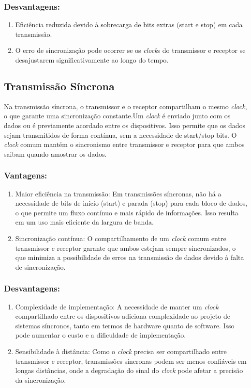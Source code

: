 \documentclass[12pt]{article}
\begin{document}
\subsubsection{Desvantagens:}
\begin{enumerate}
    \item Eficiência reduzida devido à sobrecarga de bits extras (start e stop) em cada transmissão.
    \item O erro de sincronização pode ocorrer se os \textit{clock}s do transmissor e receptor se desajustarem significativamente ao longo do tempo.
\end{enumerate}

\subsection{Transmissão Síncrona}
Na transmissão síncrona, o transmissor e o receptor compartilham o mesmo \textit{clock}, o que garante uma sincronização constante.Um \textit{clock} é enviado junto com os dados ou é previamente acordado entre os dispositivos. Isso permite que os dados sejam transmitidos de forma contínua, sem a necessidade de start/stop bits. O \textit{clock} comum mantém o sincronismo entre transmissor e receptor para que ambos saibam quando amostrar os dados.

\subsubsection{Vantagens:}
\begin{enumerate}
    \item Maior eficiência na transmissão: Em transmissões síncronas, não há a necessidade de bits de início (start) e parada (stop) para cada bloco de dados, o que permite um fluxo contínuo e mais rápido de informações. Isso resulta em um uso mais eficiente da largura de banda.
    
    \item Sincronização contínua: O compartilhamento de um \textit{clock} comum entre transmissor e receptor garante que ambos estejam sempre sincronizados, o que minimiza a possibilidade de erros na transmissão de dados devido à falta de sincronização.
\end{enumerate}

\subsubsection{Desvantagens:}
\begin{enumerate}
    \item Complexidade de implementação: A necessidade de manter um \textit{clock} compartilhado entre os dispositivos adiciona complexidade ao projeto de sistemas síncronos, tanto em termos de hardware quanto de software. Isso pode aumentar o custo e a dificuldade de implementação.
    
    \item Sensibilidade à distância: Como o \textit{clock} precisa ser compartilhado entre transmissor e receptor, transmissões síncronas podem ser menos confiáveis em longas distâncias, onde a degradação do sinal do \textit{clock} pode afetar a precisão da sincronização.
\end{enumerate}
\end{document}
